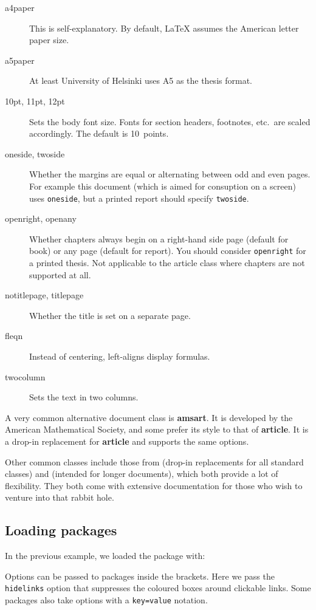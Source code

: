 \begin{description}
\item[a4paper] This is self-explanatory.
    By default, \LaTeX{} assumes the American letter paper size.
\item[a5paper] At least University of Helsinki uses A5 as the thesis format.
\item[10pt, 11pt, 12pt] Sets the body font size.
    Fonts for section headers, footnotes, etc.\ are scaled accordingly.
    The default is 10~points.
\item[oneside, twoside] Whether the margins are equal
    or alternating between odd and even pages.
    For example this document (which is aimed for consuption on a screen)
    uses \verb|oneside|, but a printed report should specify \verb|twoside|.
\item[openright, openany]
    Whether chapters always begin on a right-hand side page (default for book)
    or any page (default for report).
    You should consider \verb|openright| for a printed thesis.
    Not applicable to the article class where chapters are not supported at all.
\item[notitlepage, titlepage] Whether the title is set on a separate page.
\item[fleqn] Instead of centering, left-aligns display formulas.
\item[twocolumn] Sets the text in two columns.
\end{description}


A very common alternative document class is \textbf{amsart}.
It is developed by the American Mathematical Society,
and some prefer its style to that of \textbf{article}.
It is a drop-in replacement for \textbf{article} and supports the same options.

Other common classes include those from 
(drop-in replacements for all standard classes)
and  (intended for longer documents),
which both provide a lot of flexibility.
They both come with extensive documentation for those who wish to venture into that rabbit hole.


%
\subsection{Loading packages}\label{sec:loading packages}

In the previous example, we loaded the  package with:
\begin{ExampleCode}
\usepackage[hidelinks]{hyperref}
\end{ExampleCode}
Options can be passed to packages inside the brackets.
Here we pass the \verb|hidelinks| option that suppresses the coloured boxes around clickable links.
Some packages also take options with a \verb|key=value| notation.

